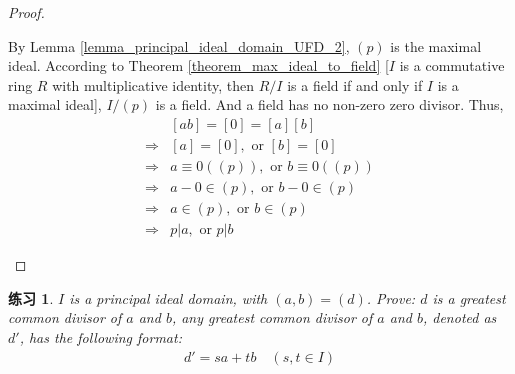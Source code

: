 \documentclass[utf8]{ctexbook}
\newtheorem{exercise}{练习}[section]
\begin{document}
\begin{proof}
\begin{enumerate}
{By Lemma \ref{lemma_principal_ideal_domain_UFD_2}, $(p)$ is the maximal ideal. According to Theorem \ref{theorem_max_ideal_to_field} [$I$ is a commutative ring $R$ with multiplicative identity, then $R/I$ is a field if and only if $I$ is a maximal ideal], $I/(p)$ is a field. And a field has no non-zero zero divisor. Thus,
\begin{align*}
& [ab] = [0] =[a][b] \\
\Longrightarrow & [a]= [0], \mbox{ or } [b] = [0] \\
\Longrightarrow & a \equiv 0 ((p)), \mbox{ or } b \equiv 0 ((p)) \\
\Longrightarrow & a - 0 \in (p), \mbox{ or } b - 0 \in (p) \\
\Longrightarrow & a \in (p), \mbox{ or } b \in (p) \\
\Longrightarrow & p | a , \mbox{ or } p | b
\end{align*}
}
\end{enumerate}


\end{proof}


\begin{exercise}\label{exercise_PID_1}
$I$ is a principal ideal domain, with $(a, b) = (d)$. Prove: $d$ is a greatest common divisor of $a$ and $b$, any greatest common divisor of $a$ and $b$, denoted as $d'$, has the following format:
\begin{align*}
d' = s a + t b \quad (s, t \in I) \label{eq_exercise_PID_1}
\end{align*} 
\end{exercise}
\end{document}
